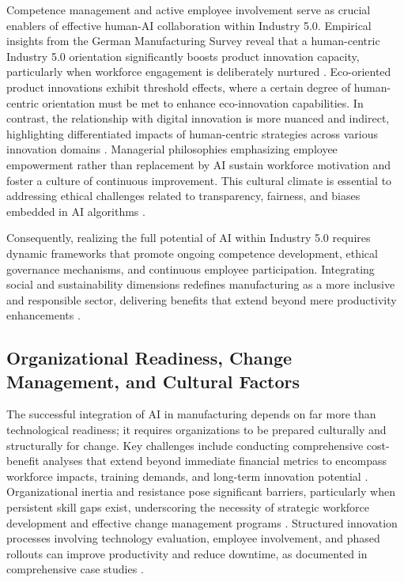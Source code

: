 \documentclass[sigconf]{acmart}
\begin{document}
Competence management and active employee involvement serve as crucial enablers of effective human-AI collaboration within Industry 5.0. Empirical insights from the German Manufacturing Survey reveal that a human-centric Industry 5.0 orientation significantly boosts product innovation capacity, particularly when workforce engagement is deliberately nurtured \cite{ref6}. Eco-oriented product innovations exhibit threshold effects, where a certain degree of human-centric orientation must be met to enhance eco-innovation capabilities. In contrast, the relationship with digital innovation is more nuanced and indirect, highlighting differentiated impacts of human-centric strategies across various innovation domains \cite{ref7}. Managerial philosophies emphasizing employee empowerment rather than replacement by AI sustain workforce motivation and foster a culture of continuous improvement. This cultural climate is essential to addressing ethical challenges related to transparency, fairness, and biases embedded in AI algorithms \cite{ref9,ref15,ref36}.

Consequently, realizing the full potential of AI within Industry 5.0 requires dynamic frameworks that promote ongoing competence development, ethical governance mechanisms, and continuous employee participation. Integrating social and sustainability dimensions redefines manufacturing as a more inclusive and responsible sector, delivering benefits that extend beyond mere productivity enhancements \cite{ref38}.

\subsection{Organizational Readiness, Change Management, and Cultural Factors}

The successful integration of AI in manufacturing depends on far more than technological readiness; it requires organizations to be prepared culturally and structurally for change. Key challenges include conducting comprehensive cost-benefit analyses that extend beyond immediate financial metrics to encompass workforce impacts, training demands, and long-term innovation potential \cite{ref3}. Organizational inertia and resistance pose significant barriers, particularly when persistent skill gaps exist, underscoring the necessity of strategic workforce development and effective change management programs \cite{ref19}. Structured innovation processes involving technology evaluation, employee involvement, and phased rollouts can improve productivity and reduce downtime, as documented in comprehensive case studies \cite{ref19}.
\end{document}
